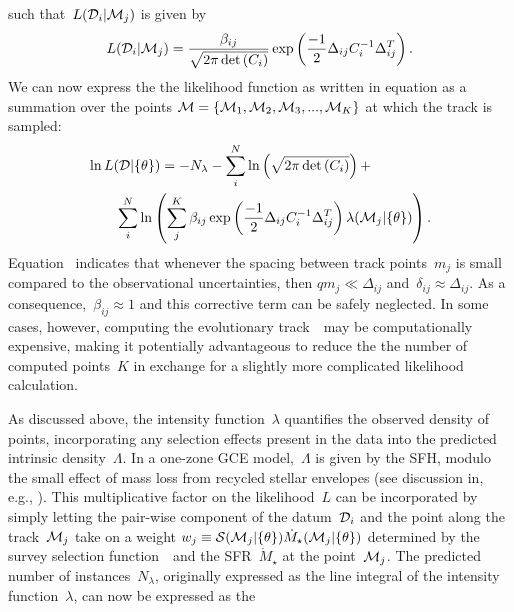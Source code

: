 \documentclass[ms.tex]{subfiles}
\begin{document}
such that~$L(\mathcal{D}_i | \mathcal{M}_j)$ is given by
\begin{equation}
L(\mathcal{D}_i | \mathcal{M}_j) = \frac{\beta_{ij}}{\sqrt{2\pi \det{(C_i)}}}
\exp\left(\frac{-1}{2}\Delta_{ij} C_i^{-1} \Delta_{ij}^T\right).
\end{equation}
We can now express the the likelihood function as written in equation
 as a summation over the points
$\mathcal{M} = \{\mathcal{M}_1, \mathcal{M}_2, \mathcal{M}_3, ..., \mathcal{M}_K\}$
at which the track is sampled:
\begin{equation}\begin{split}
&\ln L(\mathcal{D} | \{\theta\}) = -N_\lambda
- \sum_i^N \ln \left(\sqrt{2\pi \det{(C_i)}}\right) +
\\
&\qquad \sum_i^N \ln \left(
\sum_j^K \beta_{ij}
\exp\left(\frac{-1}{2}\Delta_{ij}C_i^{-1}\Delta_{ij}^T\right)
\lambda(\mathcal{M}_j | \{\theta\})
\right).
\end{split}\end{equation}
Equation~ indicates that whenever the spacing between
track points~$m_j$ is small compared to the observational uncertainties, then
$qm_j \ll \Delta_{ij}$ and~$\delta_{ij} \approx \Delta_{ij}$.
As a consequence,~$\beta_{ij} \approx 1$ and this corrective term can be safely
neglected.
In some cases, however, computing the evolutionary track~~may be
computationally expensive, making it potentially advantageous to reduce the
the number of computed points~$K$ in exchange for a slightly more complicated
likelihood calculation.
\par
As discussed above, the intensity function~$\lambda$ quantifies the observed
density of points, incorporating any selection effects present in the data into
the predicted intrinsic density~$\Lambda$.
In a one-zone GCE model,~$\Lambda$ is given by the SFH, modulo the small effect
of mass loss from recycled stellar envelopes (see discussion in, e.g.,
\citealt{Weinberg2017}).
This multiplicative factor on the likelihood~$L$ can be incorporated by simply
letting the pair-wise component of the datum~$\mathcal{D}_i$ and the point along
the track~$\mathcal{M}_j$ take on a weight
$w_j \equiv \mathcal{S}(\mathcal{M}_j | \{\theta\}) \dot{M}_\star(\mathcal{M}_j |
\{\theta\})$ determined by the survey selection function~~and the
SFR~$\dot{M}_\star$ at the point~$\mathcal{M}_j$.
The predicted number of instances~$N_\lambda$, originally expressed as the
line integral of the intensity function~$\lambda$, can now be expressed as the
\end{document}
